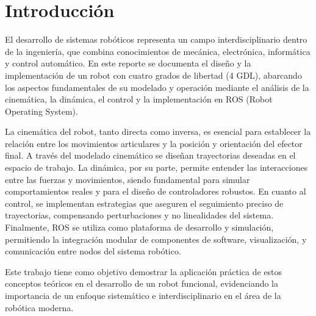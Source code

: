 \chapter{Introducción} \label{chap:introduccion}
El desarrollo de sistemas robóticos representa un campo interdisciplinario dentro de la ingeniería, que combina conocimientos de mecánica, electrónica, informática y control automático. En este reporte se documenta el diseño y la implementación de un robot con cuatro grados de libertad (4 GDL), abarcando los aspectos fundamentales de su modelado y operación mediante el análisis de la cinemática, la dinámica, el control y la implementación en ROS (Robot Operating System).

La cinemática del robot, tanto directa como inversa, es esencial para establecer la relación entre los movimientos articulares y la posición y orientación del efector final. A través del modelado cinemático se diseñan trayectorias deseadas en el espacio de trabajo. La dinámica, por su parte, permite entender las interacciones entre las fuerzas y movimientos, siendo fundamental para simular comportamientos reales y para el diseño de controladores robustos. En cuanto al control, se implementan estrategias que aseguren el seguimiento preciso de trayectorias, compensando perturbaciones y no linealidades del sistema. Finalmente, ROS se utiliza como plataforma de desarrollo y simulación, permitiendo la integración modular de componentes de software, visualización, y comunicación entre nodos del sistema robótico.

Este trabajo tiene como objetivo demostrar la aplicación práctica de estos conceptos teóricos en el desarrollo de un robot funcional, evidenciando la importancia de un enfoque sistemático e interdisciplinario en el área de la robótica moderna.
